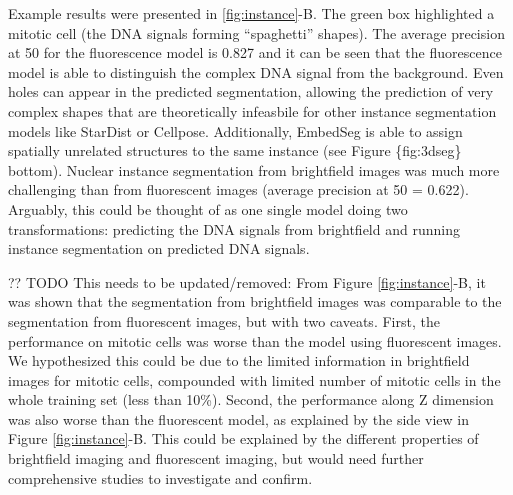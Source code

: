Example results were presented in \ref{fig:instance}-B. The green box highlighted a mitotic cell (the DNA signals forming ``spaghetti'' shapes). The average precision at 50 for the fluorescence model is 0.827 and it can be seen that the fluorescence model is able to distinguish the complex DNA signal from the background. Even holes can appear in the predicted segmentation, allowing the prediction of very complex shapes that are theoretically infeasbile for other instance segmentation models like StarDist or Cellpose. Additionally, EmbedSeg is able to assign spatially unrelated structures to the same instance (see Figure \{fig:3dseg\} bottom). Nuclear instance segmentation from brightfield images was much more challenging than from fluorescent images (average precision at 50 = 0.622). Arguably, this could be thought of as one single model doing two transformations: predicting the DNA signals from brightfield and running instance segmentation on predicted DNA signals.

?? TODO This needs to be updated/removed:
From Figure \ref{fig:instance}-B, it was shown that the segmentation from brightfield images was comparable to the segmentation from fluorescent images, but with two caveats. First, the performance on mitotic cells was worse than the model using fluorescent images. We hypothesized this could be due to the limited information in brightfield images for mitotic cells, compounded with limited number of mitotic cells in the whole training set (less than 10\%). Second, the performance along Z dimension was also worse than the fluorescent model, as explained by the side view in Figure \ref{fig:instance}-B. This could be explained by the different properties of brightfield imaging and fluorescent imaging, but would need further comprehensive studies to investigate and confirm.

